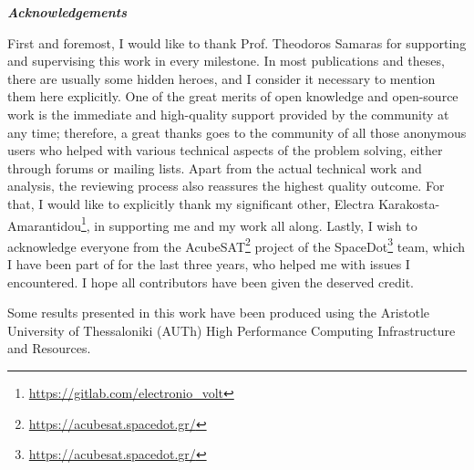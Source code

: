 \thispagestyle{plain}
\begin{center}
    \LARGE
    \textit{\textbf{Acknowledgements}}
        
    \vspace{0.4cm}
\end{center}
\normalsize

\vspace{0.9cm}
First and foremost, I would like to thank Prof. Theodoros Samaras for supporting and supervising this work in every milestone. In most publications and theses, there are usually some hidden heroes, and I consider it necessary to mention them here explicitly. One of the great merits of open knowledge and open-source work is the immediate and high-quality support provided by the community at any time; therefore, a great thanks goes to the community of all those anonymous users who helped with various technical aspects of the problem solving, either through forums or mailing lists. Apart from the actual technical work and analysis, the reviewing process also reassures the highest quality outcome. For that, I would like to explicitly thank my significant other, Electra Karakosta-Amarantidou\footnote{\href{https://gitlab.com/electronio\_volt}{https://gitlab.com/electronio\_volt}}, in supporting me and my work all along. Lastly, I wish to acknowledge everyone from the AcubeSAT\footnote{\href{https://acubesat.spacedot.gr/}{https://acubesat.spacedot.gr/}} project of the SpaceDot\footnote{\href{https://acubesat.spacedot.gr/}{https://acubesat.spacedot.gr/}} team, which I have been part of for the last three years, who helped me with issues I encountered. I hope all contributors have been given the deserved credit.

\vspace{2cm}
Some results presented in this work have been produced using the Aristotle University of Thessaloniki (AUTh) High Performance Computing Infrastructure and Resources.
\vspace*{\fill}
